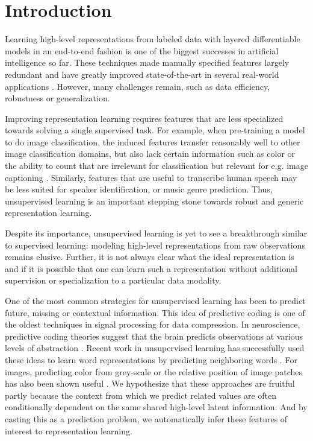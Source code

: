 \section{Introduction}

Learning high-level representations from labeled data with layered differentiable models in an end-to-end fashion is one of the biggest successes in artificial intelligence so far. These techniques made manually specified features largely redundant and have greatly improved state-of-the-art in several real-world applications \cite{krizhevsky2012imagenet, hinton2012deep, sutskever2014sequence}. However, many challenges remain, such as data efficiency, robustness or generalization. 

Improving representation learning requires features that are less specialized towards solving a single supervised task. For example, when pre-training a model to do image classification, the induced features transfer reasonably well to other image classification domains, but also lack certain information such as color or the ability to count that are irrelevant for classification but relevant for e.g. image captioning \cite{showandtell}. Similarly, features that are useful to transcribe human speech may be less suited for speaker identification, or music genre prediction. Thus, unsupervised learning is an important stepping stone towards robust and generic representation learning.

Despite its importance, unsupervised learning is yet to see a breakthrough similar to supervised learning: modeling high-level representations from raw observations remains elusive. Further, it is not always clear what the ideal representation is and if it is possible that one can learn such a representation without additional supervision or specialization to a particular data modality.

One of the most common strategies for unsupervised learning has been to predict future, missing or contextual information. This idea of predictive coding \cite{elias1955predictive, atal1970adaptive} is one of the oldest techniques in signal processing for data compression. In neuroscience, predictive coding theories suggest that the brain predicts observations at various levels of abstraction \cite{rao1999predictive, friston2005theory}. Recent work in unsupervised learning has successfully used these ideas to learn word representations by predicting neighboring words \cite{mikolov2013efficient}. For images, predicting color from grey-scale or the relative position of image patches has also been shown useful \cite{zhang2016colorful, Doersch_2015_ICCV}.
We hypothesize that these approaches are fruitful partly because the context from which we predict related values are often conditionally dependent on the same shared high-level latent information. And by casting this as a prediction problem, we automatically infer these features of interest to representation learning.

